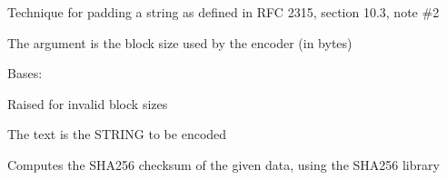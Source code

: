 \documentclass[letterpaper,10pt,english]{sphinxmanual}
\begin{document}
\begin{fulllineitems}
\label{restaurants:restaurants.key_exchange.PKCS7Encoder}
Technique for padding a string as defined in RFC 2315, section 10.3, note \#2

The argument is the block size used by the encoder (in bytes)

\begin{fulllineitems}
\label{restaurants:restaurants.key_exchange.PKCS7Encoder.InvalidBlockSizeError}
Bases: \href{http://docs.python.org/library/exceptions.html\#exceptions.Exception}{}

Raised for invalid block sizes

\end{fulllineitems}


\begin{fulllineitems}
\label{restaurants:restaurants.key_exchange.PKCS7Encoder.encode}
The text is the STRING to be encoded

\end{fulllineitems}


\begin{fulllineitems}
\label{restaurants:restaurants.key_exchange.PKCS7Encoder.decode}
\end{fulllineitems}


\end{fulllineitems}


\begin{fulllineitems}
\label{restaurants:restaurants.key_exchange.sha256}
Computes the SHA256 checksum of the given data, using the SHA256 library

\end{fulllineitems}
\end{document}
